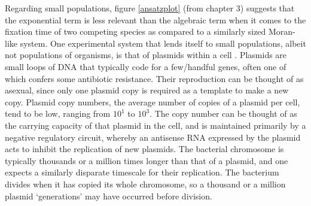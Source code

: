 Regarding small populations, figure \ref{ansatzplot} (from chapter 3) suggests that the exponential term is less relevant than the algebraic term when it comes to the fixation time of two competing species as compared to a similarly sized Moran-like system. 
One experimental system that lends itself to small populations, albeit not populations of organisms, is that of plasmids within a cell \cite{Gooding-townsend2015}. 
%
Plasmids are small loops of DNA that typically code for a few/handful genes, often one of which confers some antibiotic resistance\cite{DelSolar1998,Brock2006,VanMelderen2009}. 
Their reproduction can be thought of as asexual, since only one plasmid copy is required as a template to make a new copy. 
Plasmid copy numbers, the average number of copies of a plasmid per cell, tend to be low, ranging from $10^1$ to $10^3$. 
The copy number can be thought of as the carrying capacity of that plasmid in the cell, and is maintained primarily by a negative regulatory circuit, whereby an antisense RNA expressed by the plasmid acts to inhibit the replication of new plasmids. 
The bacterial chromosome is typically thousands or a million times longer than that of a plasmid, and one expects a similarly disparate timescale for their replication. 
The bacterium divides when it has copied its whole chromosome, so a thousand or a million plasmid `generations' may have occurred before division. 
